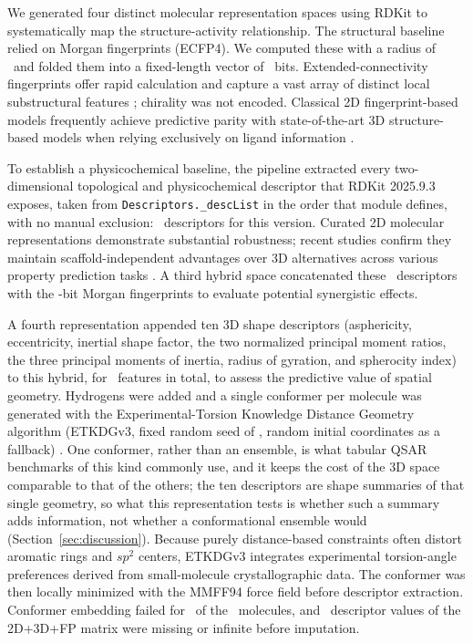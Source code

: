 We generated four distinct molecular representation spaces using RDKit \citep{landrum2025} to systematically map the structure-activity relationship. The structural baseline relied on Morgan fingerprints (ECFP4). We computed these with a radius of \MorganRadius\ and folded them into a fixed-length vector of \MorganNFeaturesTotal\ bits. Extended-connectivity fingerprints offer rapid calculation and capture a vast array of distinct local substructural features \citep{rogers2010}; chirality was not encoded. Classical 2D fingerprint-based models frequently achieve predictive parity with state-of-the-art 3D structure-based models when relying exclusively on ligand information \citep{gao2020}.

To establish a physicochemical baseline, the pipeline extracted every two-dimensional topological and physicochemical descriptor that RDKit 2025.9.3 exposes, taken from \texttt{Descriptors.\_descList} in the order that module defines, with no manual exclusion: \RdkitTwoDNFeaturesTotal\ descriptors for this version. Curated 2D molecular representations demonstrate substantial robustness; recent studies confirm they maintain scaffold-independent advantages over 3D alternatives across various property prediction tasks \citep{tiwari2026}. A third hybrid space concatenated these \RdkitTwoDNFeaturesTotal\ descriptors with the \MorganNFeaturesTotal-bit Morgan fingerprints to evaluate potential synergistic effects.

A fourth representation appended ten 3D shape descriptors (asphericity, eccentricity, inertial shape factor, the two normalized principal moment ratios, the three principal moments of inertia, radius of gyration, and spherocity index) to this hybrid, for \RdkitTwoDThreeDFpNFeaturesTotal\ features in total, to assess the predictive value of spatial geometry. Hydrogens were added and a single conformer per molecule was generated with the Experimental-Torsion Knowledge Distance Geometry algorithm (ETKDGv3, fixed random seed of \RandomSeed, random initial coordinates as a fallback) \citep{riniker2015}. One conformer, rather than an ensemble, is what tabular QSAR benchmarks of this kind commonly use, and it keeps the cost of the 3D space comparable to that of the others; the ten descriptors are shape summaries of that single geometry, so what this representation tests is whether such a summary adds information, not whether a conformational ensemble would (Section~\ref{sec:discussion}). Because purely distance-based constraints often distort aromatic rings and $sp^2$ centers, ETKDGv3 integrates experimental torsion-angle preferences derived from small-molecule crystallographic data. The conformer was then locally minimized with the MMFF94 force field before descriptor extraction. Conformer embedding failed for \RdkitTwoDThreeDFpNThreeDFailed\ of the \DataNMain\ molecules, and \RdkitTwoDThreeDFpNCellsMissing\ descriptor values of the 2D+3D+FP matrix were missing or infinite before imputation.

